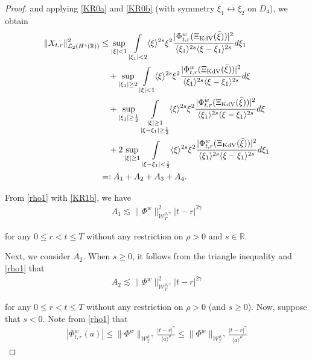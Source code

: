 \documentclass[letterpaper, 11pt,  reqno]{amsart}
\DeclareMathOperator*{\intt}{\int}
\newcommand{\1}{\hspace{0.5mm}\text{I}\hspace{0.5mm}}
\newcommand{\noi}{\noindent}
\newcommand{\R}{\mathbb{R}}
\newcommand{\g}{\gamma}
\newcommand{\les}{\lesssim}
\newcommand{\jb}[1]
{\langle #1 \rangle}
\newcommand{\cL}{\mathcal{L}}
\newcommand{\W}{\mathcal{W}}
\newcommand{\KDV}{\text{\rm KdV} }
\numberwithin{equation}{section}
\numberwithin{theorem}{section}
\begin{document}
\begin{proof}
\noi
and applying \eqref{KR0a} and \eqref{KR0b}
(with symmetry $\xi_1\leftrightarrow\xi_2$ on $D_4$), 
we obtain
\begin{align}
\|X_{t , r }\|^2_{\cL _2 (H^s (\R))}
 &
\le
\sup_{|\xi|< 1} 
  \intt_{|\xi_1|< 2} 
  \jb{\xi}^{ 2s }\xi^2
   \frac{|\Phi^{w}_{t,r} (\Xi_\KDV(\bar \xi)) |^2}{ \jb{\xi_1}^{2s}  \jb{\xi - \xi_1}^{2s}}  d\xi_1
\notag \\
& \quad + 
\sup_{|\xi_1|\ge 2}
\intt_{|\xi|< 1} \jb{\xi}^{2s}
\xi^2
\frac{|\Phi^{w}_{t,r} (\Xi_\KDV(\bar \xi)) |^2}{\jb{\xi_1}^{2s}\jb{\xi - \xi_1}^{2s}} d\xi
\notag \\ 
& \quad +
\sup_{|\xi_1|\ge \frac 12}
\intt_{\substack{|\xi|\ge 1\\|\xi-\xi_1|\ge \frac 12 }} 
\jb{\xi}^{2s}\xi^2
\frac{|\Phi^{w}_{t,r} (\Xi_\KDV(\bar \xi)) |^2}{\jb{\xi_1}^{2s}\jb{\xi - \xi_1}^{2s}} d\xi
\label{KR2} \\
& \quad +
2\sup_{|\xi|\ge 1} 
  \intt_{|\xi - \xi_1|< \frac 12} 
  \jb{\xi}^{ 2s }\xi^2
   \frac{|\Phi^{w}_{t,r} (\Xi_\KDV(\bar \xi)) |^2}{ \jb{\xi_1}^{2s}  \jb{\xi - \xi_1}^{2s}}  d\xi_1
\notag \\
& =:
A_1+ A_2 + A_3 + A_4.
\notag
\end{align}





From \eqref{rho1} with \eqref{KR1b}, we have 
\begin{align}
A_1 
\les  \|\Phi^w\|^2_{\W_T^{\rho,\g}} |t-r |^{2\g}
\label{KR3}
\end{align}

\noi
\noi
for any $0 \le r <  t \le T$
without any restriction on  $\rho > 0$ and  $s \in \R$.


Next, we consider $A_2$.
When $s \ge 0$, it follows from the triangle inequality and \eqref{rho1}
that 
\begin{align}
A_2
\les  \|\Phi^w\|^2_{\W_T^{\rho,\g}} |t-r |^{2\g}
\label{KR3a}
\end{align}
 
\noi
for any $0 \le r <  t \le T$
without any restriction on  $\rho > 0$ (and  $s\ge 0$).
Now, suppose that $ s < 0$. Note from \eqref{rho1} that
\begin{align}
|\Phi^w_{t,r}(a)|
\le
\|\Phi^w\|_{\W^{\rho,\g}_T}
\frac{|t-r|^\g}{ \jb{a}^{\rho}}
\le
\|\Phi^w\|_{\W^{\rho,\g}_T}
\frac{|t-r|^\g}{ \jb{a}^{\rho'}}
\label{KR3b}
\end{align}


\end{proof}
\end{document}

